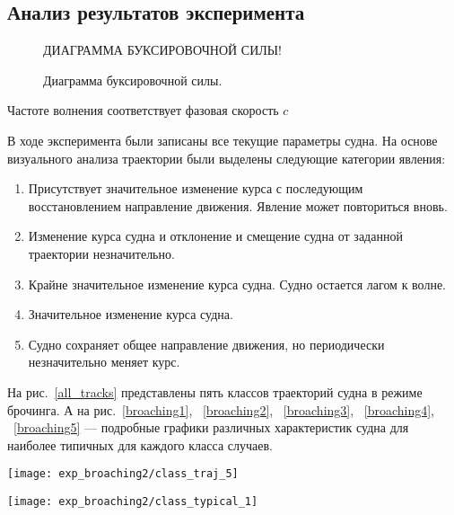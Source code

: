 
\subsection{Анализ результатов эксперимента}

\begin{figure}[ht]
	\begin{center}
	\LARGE{ДИАГРАММА БУКСИРОВОЧНОЙ СИЛЫ!}
	\end{center}
	\caption{Диаграмма буксировочной силы.}
	\label{tug_force}
\end{figure}

Частоте волнения соответствует фазовая скорость $c$

В ходе эксперимента были записаны все текущие параметры судна. На основе визуального анализа траектории были выделены следующие категории явления:

\begin{enumerate}
	\item	Присутствует значительное изменение курса с последующим восстановлением направление движения. 
			Явление может повториться вновь.
	\item	Изменение курса судна и отклонение и смещение судна от заданной траектории незначительно.
	\item	Крайне значительное изменение курса судна. Судно остается лагом к волне.
	\item	Значительное изменение курса судна.
	\item	Судно сохраняет общее направление движения, но периодически незначительно меняет курс.
\end{enumerate}

На рис.~\ref{all_tracks} представлены пять классов траекторий судна в режиме брочинга.
А на рис.~\ref{broaching1}, ~\ref{broaching2}, ~\ref{broaching3}, ~\ref{broaching4}, ~\ref{broaching5} --- подробные графики различных характеристик судна для наиболее типичных для каждого класса случаев.

\begin{sidewaysfigure}
	\begin{center}
	\texttt{[image: exp\_broaching2/class\_traj\_5]}
	\end{center}
	\caption{Классы траекторий судна в режиме брочинга.}
	\label{all_tracks}
\end{sidewaysfigure}



\begin{sidewaysfigure}
	\begin{center}	\texttt{[image: exp\_broaching2/class\_typical\_1]}	\end{center}
	\caption{Классы траектории I.}	\label{broaching11}
\end{sidewaysfigure}

